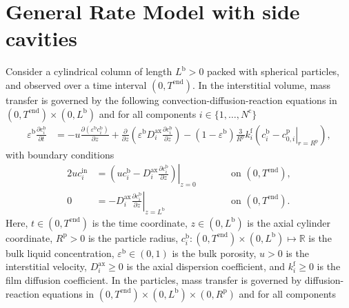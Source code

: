 \documentclass{article}
\begin{document}
\section*{General Rate Model with side cavities}
Consider a cylindrical column of length $L^{\mathrm{b}} > 0$ packed with spherical particles, and observed over a time interval $(0, T^{\mathrm{end}})$.
In the interstitial volume, mass transfer is governed by the following convection-diffusion-reaction equations in $(0, T^{\mathrm{end}})\times (0, L^{\mathrm{b}})$ and for all components $i\in\{1, \dots, N^{\mathrm{c}} \}$
\begin{align}
    \varepsilon^{\mathrm{b}} \frac{\partial c^{\mathrm{b}}_{i}}{\partial t}
    &= - u \frac{\partial \left( \varepsilon^{\mathrm{b}} c^{\mathrm{b}}_{i} \right)}{\partial z}
        + \frac{\partial}{\partial z} \left( \varepsilon^{\mathrm{b}} D^{\mathrm{ax}}_{i} \frac{\partial c^{\mathrm{b}}_{i}}{\partial z} \right)
        - \left(1 - \varepsilon^{\mathrm{b}} \right) \frac{3}{R^{\mathrm{p}}} k^{\mathrm{f}}_{i} \left(c^{\mathrm{b}}_{i} - \left. c^{\mathrm{p}}_{0,i} \right|_{r = R^{\mathrm{p}}} \right),
\end{align}
with boundary conditions
\begin{alignat}{2}
    u c^{\mathrm{in}}_{i}
    &= \left.\left( u c^{\mathrm{b}}_{i} - D^{\mathrm{ax}}_{i} \frac{\partial c^{\mathrm{b}}_{i}}{\partial z}\right)\right|_{z=0}
    & & \qquad\text{on }(0, T^{\mathrm{end}}),
    \\
    0
    &= - D^{\mathrm{ax}}_{i} \left. \frac{\partial c^{\mathrm{b}}_{i}}{\partial z} \right|_{z=L^{\mathrm{b}}}
    & & \qquad\text{on }(0, T^{\mathrm{end}}).
\end{alignat}
Here, $t\in (0, T^{\mathrm{end}})$ is the time coordinate, $z\in (0, L^{\mathrm{b}})$ is the axial cylinder coordinate, $R^{\mathrm{p}}> 0$ is the particle radius, $c^{\mathrm{b}}_{i}\colon (0, T^{\mathrm{end}})\times (0, L^{\mathrm{b}}) \mapsto \mathbb{R}$ is the bulk liquid concentration, $\varepsilon^{\mathrm{b}}\in (0, 1)$ is the bulk porosity, $u> 0$ is the interstitial velocity, $D^{\mathrm{ax}}_{i}\geq 0$ is the axial dispersion coefficient, and $k^{\mathrm{f}}_{i}\geq 0$ is the film diffusion coefficient.
In the particles, mass transfer is governed by diffusion-reaction equations in $(0, T^{\mathrm{end}}) \times (0, L^{\mathrm{b}})\times (0, R^{\mathrm{p}})$ and for all components
\end{document}

